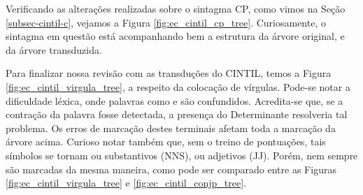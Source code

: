 \begin{center}
    
\end{center}

Verificando as alterações realizadas sobre o sintagma CP, como vimos na Seção \ref{subsec-cintil-c}, vejamos a Figura \ref{fig:ec_cintil_cp_tree}. Curiosamente, o sintagma em questão está acompanhando bem a estrutura da árvore original, e da árvore transduzida. 
\begin{center}
    
\end{center}

Para finalizar nossa revisão com as transduções do CINTIL, temos a Figura \ref{fig:ec_cintil_virgula_tree}, a respeito da colocação de vírgulas.
Pode-se notar a dificuldade léxica, onde palavras como  e  são confundidos. Acredita-se que, se a contração da palavra  fosse detectada, a presença do Determinante resolveria tal problema. Os erros de marcação destes terminais afetam toda a marcação da árvore acima. Curioso notar também que, sem o treino de pontuações, tais símbolos se tornam ou substantivos (NNS), ou adjetivos (JJ). Porém, nem sempre são marcadas da mesma maneira, como pode ser comparado entre as Figuras \ref{fig:ec_cintil_virgula_tree} e \ref{fig:ec_cintil_conjp_tree}.
